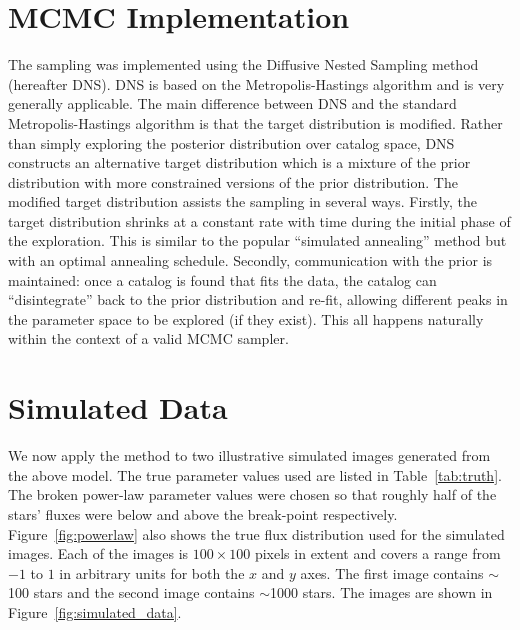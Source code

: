 \documentclass[manuscript]{aastex}
\begin{document}
\section{MCMC Implementation}
The sampling was implemented using the Diffusive Nested Sampling \citep{dnest}
method (hereafter DNS). DNS is based on the Metropolis-Hastings algorithm and
is very generally applicable. The main difference between DNS and the standard
Metropolis-Hastings algorithm is that the target distribution is modified.
Rather than simply exploring the posterior distribution over catalog space,
DNS constructs an alternative target distribution which is a mixture of the
prior distribution with more constrained versions of the prior distribution.
The modified target distribution assists the sampling in several ways.
Firstly, the target distribution shrinks at a constant rate with time during the
initial phase of the exploration. This is similar to the popular ``simulated
annealing'' method but with an optimal annealing schedule. Secondly,
communication with the prior is maintained: once a catalog is found that
fits the data, the catalog can ``disintegrate'' back to the prior distribution
and re-fit, allowing different peaks in the parameter space to be explored
(if they exist). This all happens naturally within the context of a valid
MCMC sampler.

\section{Simulated Data}\label{sec:simulated_data}
We now apply the method to two illustrative simulated images generated from
the above model. The true parameter values used are listed in
Table~\ref{tab:truth}. The broken power-law parameter values were chosen so that
roughly half of the stars' fluxes were below and above the break-point
respectively. Figure~\ref{fig:powerlaw} also shows the true flux distribution
used for the simulated images. Each of the images
is $100 \times 100$ pixels in extent and covers a range from $-1$ to $1$ in
arbitrary units for both the $x$ and $y$ axes. The first image contains
$\sim$100 stars and the second image contains $\sim$1000 stars. The images
are shown in Figure~\ref{fig:simulated_data}.
\end{document}
